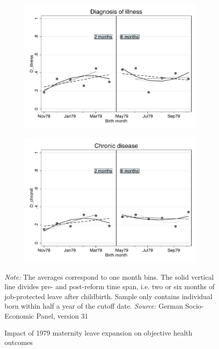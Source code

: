 \documentclass[a4paper ]{article}
\begin{document}
\begin{figure}[p]
\begin{subfigure}[h]{0.48\textwidth}\centering
	\includegraphics[width=\textwidth]{../../analysis/graphs/SOEP/D_illness_RD.pdf}
\end{subfigure}
\quad
\begin{subfigure}[h]{0.48\textwidth}\centering
	\includegraphics[width=\textwidth]{../../analysis/graphs/SOEP/D_chronill_RD.pdf}
\end{subfigure}

\caption{Impact of 1979 maternity leave expansion on objective health outcomes}\label{fig: RD_OH}
\begin{minipage}{\textwidth} %
{\footnotesize \textit{Note:} The averages correspond to one month bins. The solid vertical line divides pre- and post-reform time span, i.e. two or six months of job-protected leave after childbirth. Sample only contains individual born within half a year of the cutoff date. \newline \textit{Source: }German Socio-Economic Panel, version 31\par}
\end{minipage}
\end{figure}
\end{document}
